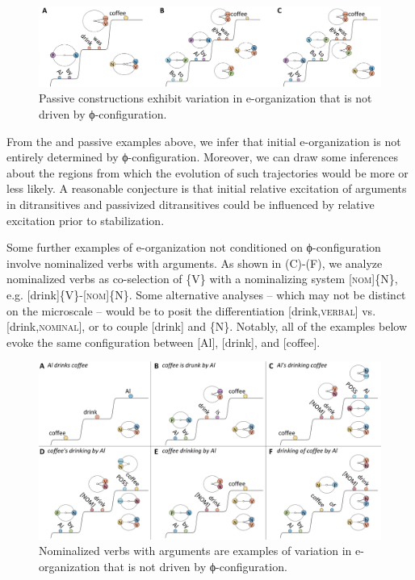   
\begin{figure}
\includegraphics[width=\textwidth]{figures/Tilsen-img81.png}
\caption{Passive constructions exhibit variation in e-organization that is not driven by ϕ-con\-fig\-u\-ra\-tion.}
\label{fig:4:31}
\end{figure}
 

  From the  and passive examples above, we infer that initial e-or\-ga\-ni\-za\-tion is not entirely determined by ϕ-con\-fig\-u\-ra\-tion. Moreover, we can draw some inferences about the  regions from which the evolution of such trajectories would be more or less likely. A reasonable conjecture is that initial relative excitation of arguments in ditransitives and passivized ditransitives could be influenced by relative excitation prior to stabilization.

  Some further examples of e-organization not conditioned on ϕ-con\-fig\-u\-ra\-tion involve nominalized verbs with arguments. As shown in {}(C)-(F), we analyze nominalized verbs as co-selection of \{V\} with a nominalizing system [\textsc{nom}]\{N\}, e.g. [drink]\{V\}-[\textsc{nom}]\{\textsc{N}\}. Some alternative analyses -- which may not be distinct on the microscale -- would be to posit the differentiation [drink,\textsc{ver\-bal}] vs. [drink,\textsc{nominal}], or to couple [drink] and \{N\}. Notably, all of the examples below evoke the same  configuration between [Al], [drink], and [coffee].

  
\begin{figure}
\includegraphics[width=\textwidth]{figures/Tilsen-img82.png}
\caption{Nominalized verbs with arguments are examples of variation in e-organization that is not driven by ϕ-con\-fig\-u\-ra\-tion.}
\label{fig:4:32}
\end{figure}
 

